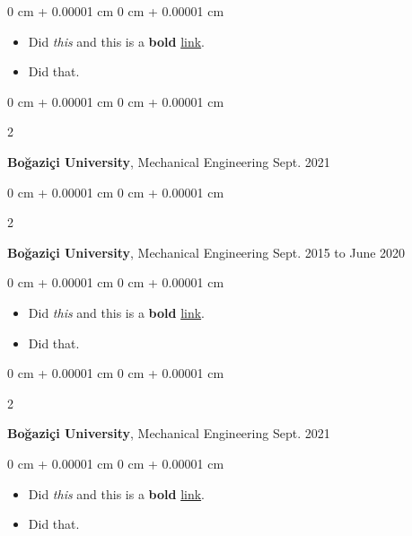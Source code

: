 \documentclass[10pt, letterpaper]{article}
\newenvironment{highlights}{
    \begin{itemize}[
        topsep=0.10 cm,
        parsep=0.10 cm,
        partopsep=0pt,
        itemsep=0pt,
        leftmargin=0 cm + 10pt
    ]
}{
    \end{itemize}
} %
\newenvironment{onecolentry}{
    \begin{adjustwidth}{
        0 cm + 0.00001 cm
    }{
        0 cm + 0.00001 cm
    }
}{
    \end{adjustwidth}
} %
\newenvironment{twocolentry}[2][]{
    \onecolentry
    \def\secondColumn{#2}
    \setcolumnwidth{\fill, 4.5 cm}
    \begin{paracol}{2}
}{
    \switchcolumn \raggedleft \secondColumn
    \end{paracol}
    \endonecolentry
} %
\begin{document}
        \vspace{0.10 cm}
        \begin{onecolentry}
            \begin{highlights}
                \item Did \textit{this} and this is a \textbf{bold} \href{https://example.com}{link}.
                \item Did that.
            \end{highlights}
        \end{onecolentry}


        \vspace{0.2 cm}

        \begin{twocolentry}{
            Sept. 2021
        }
            \textbf{Boğaziçi University}, Mechanical Engineering\end{twocolentry}



        \vspace{0.2 cm}

        \begin{twocolentry}{
            Sept. 2015 to June 2020
        }
            \textbf{Boğaziçi University}, Mechanical Engineering\end{twocolentry}

        \vspace{0.10 cm}
        \begin{onecolentry}
            \begin{highlights}
                \item Did \textit{this} and this is a \textbf{bold} \href{https://example.com}{link}.
                \item Did that.
            \end{highlights}
        \end{onecolentry}


        \vspace{0.2 cm}

        \begin{twocolentry}{
            Sept. 2021
        }
            \textbf{Boğaziçi University}, Mechanical Engineering\end{twocolentry}

        \vspace{0.10 cm}
        \begin{onecolentry}
            \begin{highlights}
                \item Did \textit{this} and this is a \textbf{bold} \href{https://example.com}{link}.
                \item Did that.
            \end{highlights}
        \end{onecolentry}
\end{document}
